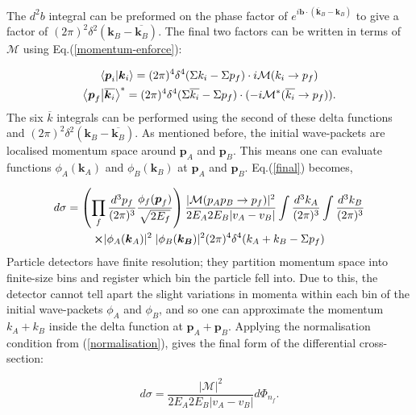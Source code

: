 \documentclass[a4paper,11pt]{article}
\begin{document}
The $d^2b$ integral can be preformed on the phase factor of $e^{i\boldsymbol{b}\cdot(\overline{\boldsymbol{k}}_B - \boldsymbol{k}_B)}$ to give a factor of $(2\pi)^2\delta^2(\boldsymbol{k}_B - \overline{\boldsymbol{k}_B})$. The final two factors can be written in terms of $\mathcal{M}$ using Eq.(\ref{momentum-enforce}):
 
\begin{gather*}
	\bra{\boldsymbol{p}_i}\ket{\boldsymbol{k}_i} = (2\pi)^4 \delta^4(\Sigma k_i - \Sigma p_f) \cdot i\mathcal{M}(k_i \rightarrow p_f)\\
	\bra{\boldsymbol{p}_f}\ket{\overline{\boldsymbol{k}_i}}^* = (2\pi)^4 \delta^4(\Sigma \overline{k_i} - \Sigma p_f) \cdot (-i\mathcal{M^*}(\overline{k_i}\rightarrow p_f)).	
\end{gather*}
The six $\overline{k}$ integrals can be performed using the second of these delta functions and $(2\pi)^2\delta^2(\boldsymbol{k}_B - \overline{\boldsymbol{k}_B})$. As mentioned before, the initial wave-packets are localised momentum space around $\boldsymbol{p}_A$ and $\boldsymbol{p}_B$. This means one can evaluate functions $\phi_A(\boldsymbol{k}_A)$ and  $\phi_B(\boldsymbol{k}_B)$ at $\boldsymbol{p}_A$ and $\boldsymbol{p}_B$. Eq.(\ref{final}) becomes,

\begin{gather*}
		d\sigma = \left(\prod_{f} \frac{d^3p_f}{(2\pi)^3} \frac{\phi_f(\boldsymbol{p}_f)}{\sqrt{2E_f}}\right)  \frac{|\mathcal{M}(p_Ap_B \rightarrow p_f)|^2}{2E_A2E_B|v_A-v_B|}\int \frac{d^3k_A}{(2\pi)^3}\int \frac{d^3k_B}{(2\pi)^3} \\
		\cross |\phi_A(\boldsymbol{k}_A)|^2\;|\phi_B(\boldsymbol{k_B})|^2 (2\pi)^4 \delta^4(k_A +k_B -\Sigma p_f)
\end{gather*}
Particle detectors have finite resolution; they partition momentum space into finite-size bins and register which bin the particle fell into. Due to this, the detector cannot tell apart the slight variations in momenta within each bin of the initial wave-packets $\phi_A$ and $\phi_B$, and so one can approximate the momentum $k_A + k_B$ inside the delta function at $\boldsymbol{p}_A + \boldsymbol{p}_B$. Applying the normalisation condition from (\ref{normalisation}), gives the final form of the differential cross-section:

\begin{equation}\label{general_cross}
	d\sigma  =\frac{|\mathcal{M}|^2}{2E_A 2E_B |v_A - v_B|}d\Phi_{n_f}.
\end{equation}
\end{document}
